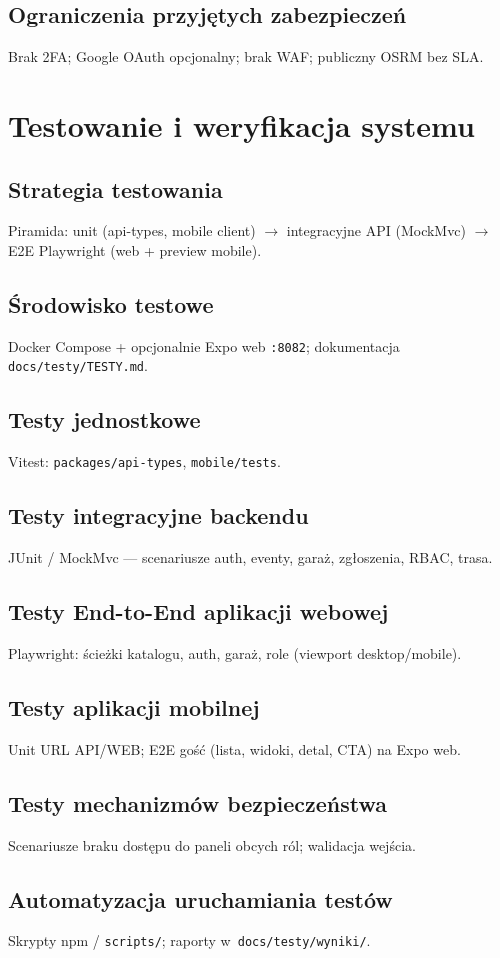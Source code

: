 \documentclass{sprz}
\begin{document}
\section{Ograniczenia przyjętych zabezpieczeń}  
Brak 2FA; Google OAuth opcjonalny; brak WAF; publiczny OSRM bez SLA.  
  
\chapter{Testowanie i weryfikacja systemu}  
\label{ch:testy}  
\section{Strategia testowania}  
Piramida: unit (api-types, mobile client) $\rightarrow$ integracyjne API (MockMvc) $\rightarrow$ E2E Playwright (web + preview mobile).  
\section{Środowisko testowe}  
Docker Compose + opcjonalnie Expo web \texttt{:8082}; dokumentacja \texttt{docs/testy/TESTY.md}.  
\section{Testy jednostkowe}  
Vitest: \texttt{packages/api-types}, \texttt{mobile/tests}.  
\section{Testy integracyjne backendu}  
JUnit / MockMvc --- scenariusze auth, eventy, garaż, zgłoszenia, RBAC, trasa.  
\section{Testy End-to-End aplikacji webowej}  
Playwright: ścieżki katalogu, auth, garaż, role (viewport desktop/mobile).  
\section{Testy aplikacji mobilnej}  
Unit URL API/WEB; E2E gość (lista, widoki, detal, CTA) na Expo web.  
\section{Testy mechanizmów bezpieczeństwa}  
Scenariusze braku dostępu do paneli obcych ról; walidacja wejścia.  
\section{Automatyzacja uruchamiania testów}  
Skrypty npm / \texttt{scripts/}; raporty w~\texttt{docs/testy/wyniki/}.  
\end{document}
